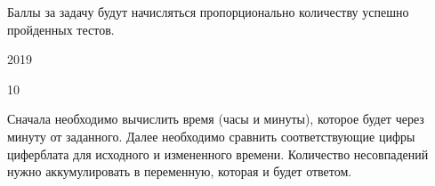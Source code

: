 \markSection

Баллы за задачу будут начисляться пропорционально количеству успешно пройденных тестов.


\begin{myverbbox}[\small]{\vinput}
    2019
\end{myverbbox}
\begin{myverbbox}[\small]{\voutput}
    10
\end{myverbbox}

\solutionSection

Сначала необходимо вычислить время (часы и минуты), которое будет через минуту от заданного. Далее необходимо сравнить соответствующие цифры циферблата для исходного и измененного времени. Количество несовпадений нужно аккумулировать в переменную, которая и будет ответом.

